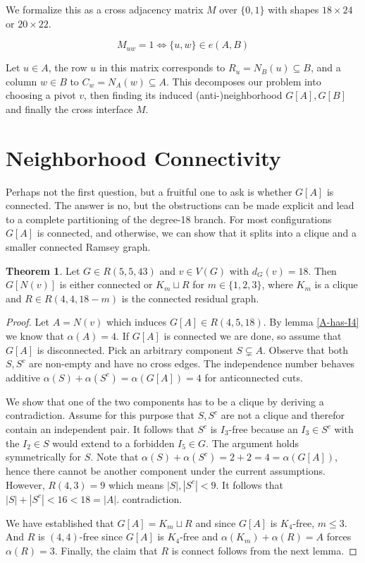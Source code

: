 \documentclass[a4paper]{article}
\newcommand{\abs}[1]{\left|#1\right|}
\theoremstyle{definition}
\newtheorem{theorem}{Theorem}
\begin{document}
We formalize this as a cross adjacency matrix $M$ over $\{ 0, 1\}$ with shapes $18 \times 24$ or $20 \times 22$.

$$M_{uw} = 1 \iff \{ u, w\} \in e(A, B)$$

Let $u \in A$, the row $u$ in this matrix corresponds to $R_u = N_B(u) \subseteq B$,
and a column $w \in B$ to $C_w = N_A(w) \subseteq A$.
This decomposes our problem into choosing a pivot $v$, then finding its induced (anti-)neighborhood $G[A], G[B]$ and finally the cross interface $M$.

\section{Neighborhood Connectivity}

Perhaps not the first question, but a fruitful one to ask is whether $G[A]$ is connected.
The answer is no, but the obstructions can be made explicit and lead to a complete partitioning of the degree-18 branch.
For most configurations $G[A]$ is connected, and otherwise,
we can show that it splits into a clique and a smaller connected Ramsey graph.

\begin{theorem}
	Let $G \in R(5, 5, 43)$ and $v \in V(G)$ with $d_G(v) = 18$.
	Then $G[N(v)]$ is either connected or $K_m \sqcup R$ for $m \in \{1, 2, 3\}$,
	where $K_m$ is a clique and $R \in R(4,4,18-m)$ is the connected residual graph.
\end{theorem}
\begin{proof}
	Let $A = N(v)$ which induces $G[A] \in R(4, 5, 18)$.
	By lemma \ref{A-has-I4} we know that $\alpha(A) = 4$.
	If $G[A]$ is connected we are done, so assume that $G[A]$ is disconnected.
	Pick an arbitrary component $S \subsetneq A$. Observe that both $S, S^c$ are non-empty and have no cross edges.
	The independence number behaves additive $\alpha(S) + \alpha(S^c) = \alpha(G[A]) = 4$ for anticonnected cuts.

	We show that one of the two components has to be a clique by deriving a contradiction.
	Assume for this purpose that $S, S^c$ are not a clique and therefor contain an independent pair.
	It follows that $S^c$ is $I_3$-free because an $I_3 \in S^c$ with the $I_2 \in S$ would extend to a forbidden $I_5 \in G$.
	The argument holds symmetrically for $S$.
	Note that $\alpha(S) + \alpha(S^c) = 2 + 2 = 4 = \alpha(G[A])$,
	hence there cannot be another component under the current assumptions.
	However, $R(4, 3) = 9$ which means $\abs{S}, \abs{S^c} < 9$.
	It follows that $\abs{S} + \abs{S^c} < 16 < 18 = \abs{A}$. contradiction.

	We have established that $G[A] = K_m \sqcup R$ and since $G[A]$ is $K_4$-free, $m \leqslant 3$.
	And $R$ is $(4,4)$-free since $G[A]$ is $K_4$-free and $\alpha(K_m) + \alpha(R) = A$ forces $\alpha(R) = 3$.
	Finally, the claim that $R$ is connect follows from the next lemma.
\end{proof}
\end{document}
